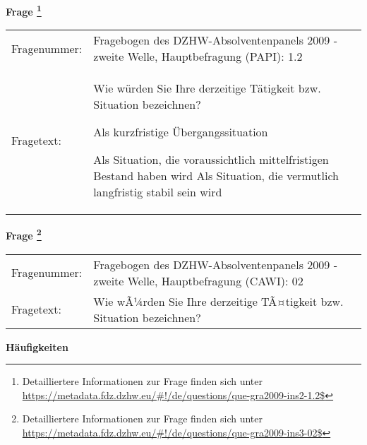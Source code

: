				\vspace*{0.5cm}
                \noindent\textbf{Frage
	                \footnote{Detailliertere Informationen zur Frage finden sich unter
		              \url{https://metadata.fdz.dzhw.eu/\#!/de/questions/que-gra2009-ins2-1.2$}}}\\
				\begin{tabularx}{\hsize}{@{}lX}
					Fragenummer: &
					  Fragebogen des DZHW-Absolventenpanels 2009 - zweite Welle, Hauptbefragung (PAPI):
					  1.2
 \\
					Fragetext: & Wie würden Sie Ihre derzeitige Tätigkeit bzw. Situation bezeichnen?\par  Als kurzfristige Übergangssituation\par  Als Situation, die voraussichtlich mittelfristigen Bestand haben wird Als Situation, die vermutlich langfristig stabil sein wird \\
				\end{tabularx}
				\vspace*{0.5cm}
                \noindent\textbf{Frage
	                \footnote{Detailliertere Informationen zur Frage finden sich unter
		              \url{https://metadata.fdz.dzhw.eu/\#!/de/questions/que-gra2009-ins3-02$}}}\\
				\begin{tabularx}{\hsize}{@{}lX}
					Fragenummer: &
					  Fragebogen des DZHW-Absolventenpanels 2009 - zweite Welle, Hauptbefragung (CAWI):
					  02
 \\
					Fragetext: & Wie wÃ¼rden Sie Ihre derzeitige TÃ¤tigkeit bzw. Situation bezeichnen? \\
				\end{tabularx}





        		\vspace*{0.5cm}
                \noindent\textbf{Häufigkeiten}

